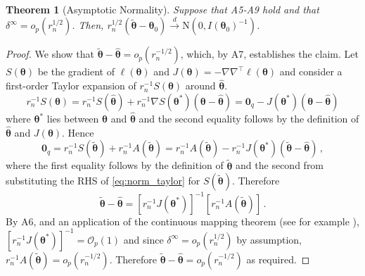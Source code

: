\documentclass[11pt, a4paper]{article}
\newcommand*{\bb}{\boldsymbol}
\newcommand{\Op}[1]{\ensuremath{{\mathcal{O}_p(#1)}}}
\theoremstyle{example} \newtheorem{example}{Example}[section]
\theoremstyle{theorem} \newtheorem{theorem}{Theorem}[section]
\def\btheta{\bb{\theta}}
\def\b0{\bb{0}}
\def\btnod{\bb{\theta}_0}
\def\bttilde{\tilde{\bb{\theta}}}
\begin{document}
       
\begin{theorem}[Asymptotic Normality]
  \label{thm:asymp_norm_soft_pen}
  Suppose that A5-A9 hold and that $\delta^\infty = o_p(r_n^{1/2})$. Then, $r_n^{1/2}(\bttilde-\btnod) \overset{d}{\to} \text{N}(0,I(\btnod)^{-1})$.
\end{theorem}
\begin{proof}
	We show that $\tilde{\bb \theta} -\hat{\bb \theta} = o_p(r_n^{-1/2})$, which, by A7, establishes the claim. Let $S(\btheta)$ be the gradient of $\ell(\btheta)$ and $J(\btheta) = -\nabla\nabla^\top \ell(\btheta)$ and consider a first-order Taylor expansion of $r_n^{-1}S(\btheta)$ around $\hat{\btheta}$. 
	\begin{equation}\label{eq:norm_taylor}
	r_n^{-1}S(\btheta) = r_n^{-1}S(\hat{\btheta}) + r_n^{-1} \nabla S(\btheta^*) (\btheta-\hat{\btheta}) = \b0_q -J(\btheta^*)(\btheta-\hat{\btheta})
	\end{equation}
	where $\btheta^*$ lies between $\btheta$ and $\hat{\btheta}$ and the second equality follows by the definition of $\hat{\btheta}$ and $J(\btheta)$. Hence
	\begin{equation}\label{eq:norm_taylor2}
	\b0_q = r_n^{-1}S(\bttilde) + r_n^{-1}A(\bttilde) = r_n^{-1} A(\bttilde) - r_n^{-1}J(\btheta^*)(\bttilde-\hat{\btheta})  \, , 
	\end{equation}
	where the first equality follows by the definition of $\bttilde$ and the second from substituting the RHS of \eqref{eq:norm_taylor} for $S(\bttilde)$. Therefore 
	\begin{equation}
	\tilde{\bb \theta} -\hat{\bb \theta} = [r_n^{-1}J(\btheta^*)]^{-1} [r_n^{-1}A(\bttilde)] \, . 
	\end{equation}
	By A6, and an application of the continuous mapping theorem (see for example \citet[Theorem 2.1]{vaart:1998}), $[r_n^{-1}J(\btheta^*)]^{-1} = \Op{1}$ and since $\delta^\infty = o_p(r_n^{1/2})$ by assumption, $r_n^{-1}A(\bttilde) = o_p(r_n^{-1/2})$. Therefore $\tilde{\bb \theta} -\hat{\bb \theta} = o_p(r_n^{-1/2})$ as required. 
\end{proof}
\end{document}
